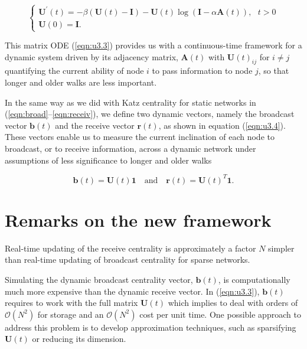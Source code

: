 \begin{equation}
\label{eqn:u3.3}
    \begin{cases}
      \mathbf{U^{\prime}}(t) = -\beta (\mathbf{U}(t) - \mathbf{I}) - \mathbf{U}(t)\log (\mathbf{I} - \alpha \mathbf{A}(t)), ~~~t>0\\
      \mathbf{U}(0)=\mathbf{I}.
    \end{cases}
\end{equation}

This matrix ODE (\ref{eqn:u3.3}) provides us with a continuous-time framework for a dynamic system driven by its adjacency matrix, $\mathbf{A}(t)$ with $\mathbf{U}(t)_{ij}$ for $i\ne j$ quantifying the current ability of node $i$ to pass information to node $j$, so that longer and older walks are less important.

\newpage

In the same way as we did with Katz centrality for static networks in (\ref{eqn:broad}--\ref{eqn:receiv}), we define two dynamic vectors, namely the broadcast vector $\mathbf{b}(t)$ and the receive vector $\mathbf{r}(t)$, as shown in equation (\ref{eqn:u3.4}). These vectors enable us to measure the current inclination of each node to broadcast, or to receive information, across a dynamic network under assumptions of less significance to longer and older walks

\begin{equation}
\label{eqn:u3.4}
    \mathbf{b}(t) = \mathbf{U}(t)\mathbf{1} \text{~~~and~~~} \mathbf{r}(t) = \mathbf{U}(t)^T\mathbf{1}.
\end{equation}
\section{Remarks on the new framework}
\label{sec:remarks}

\begin{highlightedParagraphC}
 
Real-time updating of the receive centrality is approximately a factor $N$ simpler than real-time updating of broadcast centrality for sparse networks.

\end{highlightedParagraphC}

Simulating the dynamic broadcast centrality vector, $\mathbf{b}(t)$, is computationally much more expensive than the dynamic receive vector. In (\ref{eqn:u3.3}), $\mathbf{b}(t)$ requires to work with the full matrix $\mathbf{U}(t)$ which implies to deal with orders of $\mathcal{O}(N^2)$ for storage and an $\mathcal{O}(N^2)$ cost per unit time. One possible approach to address this problem is to develop approximation techniques, such as sparsifying $\mathbf{U}(t)$ or reducing its dimension.

